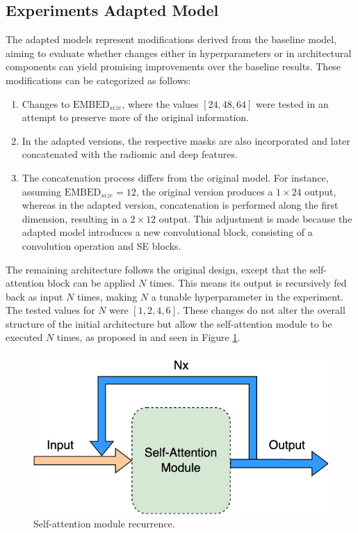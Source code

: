 \documentclass[journal,twoside,web]{ieeecolor}
\begin{document}
\subsection{Experiments Adapted Model}

The adapted models represent modifications derived from the baseline model, aiming to evaluate whether changes either in hyperparameters or in architectural components can yield promising improvements over the baseline results. These modifications can be categorized as follows:  

\begin{enumerate}  

\item Changes to $\text{EMBED}_{size}$, where the values $[24, 48, 64]$ were tested in an attempt to preserve more of the original information.  

\item In the adapted versions, the respective masks are also incorporated and later concatenated with the radiomic and deep features.  

\item The concatenation process differs from the original model. For instance, assuming $\text{EMBED}_{size} = 12$, the original version produces a $1\times24$ output, whereas in the adapted version, concatenation is performed along the first dimension, resulting in a $2\times12$ output. This adjustment is made because the adapted model introduces a new convolutional block, consisting of a convolution operation and \gls{SE} blocks.  

\end{enumerate}  

The remaining architecture follows the original design, except that the self-attention block can be applied $N$ times. This means its output is recursively fed back as input $N$ times, making $N$ a tunable hyperparameter in the experiment. The tested values for $N$ were $[1, 2, 4, 6]$. These changes do not alter the overall structure of the initial architecture but allow the self-attention module to be executed $N$ times, as proposed in \cite{vaswaniAttentionAllYou2023} and seen in Figure \ref{fig03}.

\begin{figure}[h]
\centerline{\includegraphics[width=\columnwidth]{figures/fig03.png}}
\caption{Self-attention module recurrence.}
\label{fig03}
\end{figure}
\end{document}
